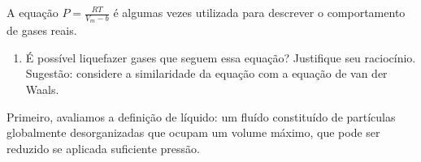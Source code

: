\begin{xcs}
    A equação \( P = \frac{RT}{V_m - b} \) é algumas vezes utilizada para
    descrever o comportamento de gases reais. 
    \begin{enumerate}[label=\alph*.]
        \item É possível liquefazer gases que seguem essa equação? Justifique
            seu raciocínio. Sugestão: considere a similaridade da equação com a
            equação de van der Waals. 
    \end{enumerate}
\end{xcs}
\begin{rsl}
    Primeiro, avaliamos a definição de líquido: um fluído constituído de partículas
    globalmente desorganizadas que ocupam um volume máximo, que pode ser reduzido se
    aplicada suficiente pressão.  
\end{rsl}
